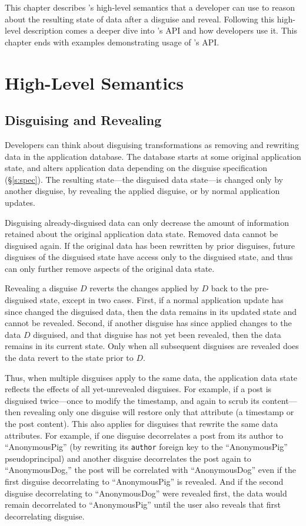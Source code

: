 This chapter describes \sys's high-level semantics that a developer can use to
reason about the resulting state of data after a disguise and reveal. Following
this high-level description comes a deeper dive into \sys's API and how
developers use it. This chapter ends with examples demonstrating usage of \sys's API.

\section{High-Level Semantics}

\subsection{Disguising and Revealing}
Developers can think about disguising transformations as removing and rewriting
data in the application database.
%
The database starts at some original application state, and alters application
data depending on the disguise specification (\S\ref{s:spec}).  The resulting
state---the disguised data state---is changed only by another disguise, by
revealing the applied disguise, or by normal application updates.
%

%
Disguising already-disguised data can only decrease the amount of information
retained about the original application data state. Removed data cannot be
disguised again. If the original data has been rewritten by prior disguises,
future disguises of the disguised state have access only to the disguised state,
and thus can only further remove aspects of the original data state.
%

%
Revealing a disguise $D$ reverts the changes applied by $D$ back to the
pre-disguised state, except in two cases. First, if a normal application update has since
changed the disguised data, then the data remains in its updated state and
cannot be revealed.
%
Second, if another disguise has since applied changes to the data $D$ disguised,
and that disguise has not yet been revealed, then the data remains in its
current state.
%
Only when all subsequent disguises are revealed does the data revert to the 
state prior to $D$.
%

%
Thus, when multiple disguises apply to the same data, the application data state reflects the
effects of all yet-unrevealed disguises.
%
For example, if a post is disguised twice---once to modify the timestamp, and
again to scrub its content---then revealing only one disguise will restore only
that attribute (\eg a timestamp or the post content). 
%
This also applies for disguises that rewrite the same data attributes. For
example, if one disguise decorrelates a post from its author to ``AnonymousPig''
(\ie by rewriting its \texttt{author} foreign key to the ``AnonymousPig''
pseudoprincipal) and another disguise decorrelates the post again to
``AnonymousDog,'' the post will be correlated with ``AnonymousDog'' even if the
first disguise decorrelating to ``AnonymousPig'' is revealed.
%
And if the second disguise decorrelating to ``AnonymousDog'' were revealed
first, the data would remain decorrelated to ``AnonymousPig'' until the user
also reveals that first decorrelating disguise.
%

